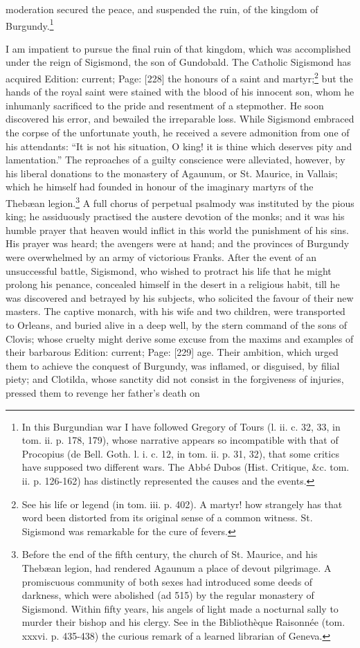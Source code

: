 moderation secured the peace, and suspended the ruin, of the kingdom of Burgundy.\footnote{In this Burgundian war I have followed Gregory of Tours (l. ii. c. 32, 33, in tom. ii. p. 178, 179), whose narrative appears so incompatible with that of Procopius (de Bell. Goth. l. i. c. 12, in tom. ii. p. 31, 32), that some critics have supposed two different wars. The Abbé Dubos (Hist. Critique, \&c. tom. ii. p. 126-162) has distinctly represented the causes and the events.}

I am impatient to pursue the final ruin of that kingdom, which was accomplished under the reign of Sigismond, the son of Gundobald. The Catholic Sigismond has acquired Edition: current; Page: [228] the honours of a saint and martyr;\footnote{See his life or legend (in tom. iii. p. 402). A martyr! how strangely has that word been distorted from its original sense of a common witness. St. Sigismond was remarkable for the cure of fevers.} but the hands of the royal saint were stained with the blood of his innocent son, whom he inhumanly sacrificed to the pride and resentment of a stepmother. He soon discovered his error, and bewailed the irreparable loss. While Sigismond embraced the corpse of the unfortunate youth, he received a severe admonition from one of his attendants: \texthebrew{“}It is not his situation, O king! it is thine which deserves pity and lamentation.\texthebrew{}” The reproaches of a guilty conscience were alleviated, however, by his liberal donations to the monastery of Agaunum, or St. Maurice, in Vallais; which he himself had founded in honour of the imaginary martyrs of the Thebæan legion.\footnote{Before the end of the fifth century, the church of St. Maurice, and his Thebæan legion, had rendered Agaunum a place of devout pilgrimage. A promiscuous community of both sexes had introduced some deeds of darkness, which were abolished (ad 515) by the regular monastery of Sigismond. Within fifty years, his angels of light made a nocturnal sally to murder their bishop and his clergy. See in the Bibliothèque Raisonnée (tom. xxxvi. p. 435-438) the curious remark of a learned librarian of Geneva.} A full chorus of perpetual psalmody was instituted by the pious king; he assiduously practised the austere devotion of the monks; and it was his humble prayer that heaven would inflict in this world the punishment of his sins. His prayer was heard; the avengers were at hand; and the provinces of Burgundy were overwhelmed by an army of victorious Franks. After the event of an unsuccessful battle, Sigismond, who wished to protract his life that he might prolong his penance, concealed himself in the desert in a religious habit, till he was discovered and betrayed by his subjects, who solicited the favour of their new masters. The captive monarch, with his wife and two children, were transported to Orleans, and buried alive in a deep well, by the stern command of the sons of Clovis; whose cruelty might derive some excuse from the maxims and examples of their barbarous Edition: current; Page: [229] age. Their ambition, which urged them to achieve the conquest of Burgundy, was inflamed, or disguised, by filial piety; and Clotilda, whose sanctity did not consist in the forgiveness of injuries, pressed them to revenge her father\texthebrew{}’s death on 